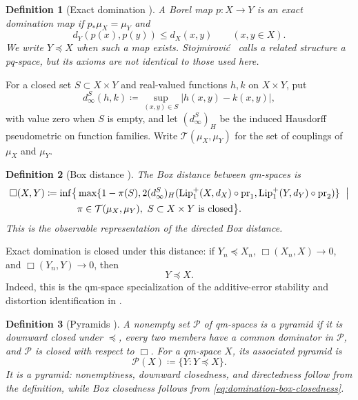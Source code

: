 \documentclass[10pt,a4paper]{amsart}
\numberwithin{equation}{section}
\newtheorem*{definition*}{Definition}
\newcommand{\Pyr}{\mathcal P}
\newcommand{\Lipplus}{\operatorname{Lip}^{+}_{1}}
\begin{document}
\begin{definition*}[Exact domination {\cite[Definition in \S2.1]{gds3-ja}}]
A Borel map $p\colon X\to Y$ is an \emph{exact domination map} if $p_*\mu_X=\mu_Y$ and
\[ d_Y(p(x),p(y))\le d_X(x,y)\qquad(x,y\in X). \]
We write $Y\preceq X$ when such a map exists.  Stojmirovi\'c~\cite{stojmirovic2004quasi} calls a related structure a pq-space, but its axioms are not identical to those used here.
\end{definition*}

For a closed set $S\subset X\times Y$ and real-valued functions $h,k$ on $X\times Y$, put
\[ d_\infty^S(h,k)\coloneqq\sup_{(x,y)\in S}|h(x,y)-k(x,y)|, \]
with value zero when $S$ is empty, and let $(d_\infty^S)_H$ be the induced Hausdorff pseudometric on function families.  Write $\mathcal T(\mu_X,\mu_Y)$ for the set of couplings of $\mu_X$ and $\mu_Y$.

\begin{definition*}[Box distance {\cite[Definitions~2.7 and~2.11]{gds3-ja}}]
The \emph{Box distance} between qm-spaces is
\begin{equation}\label{eq:qm-box-distance}
\begin{aligned}
\Box(X,Y)\coloneqq\inf\bigl\{&\max\{1-\pi(S),2(d_\infty^S)_H(\Lipplus(X,d_X)\circ\operatorname{pr}_1,\Lipplus(Y,d_Y)\circ\operatorname{pr}_2)\}\ \bigm|\\
&\pi\in\mathcal T(\mu_X,\mu_Y),\ S\subset X\times Y\text{ is closed}\bigr\}.
\end{aligned}
\end{equation}
This is the observable representation of the directed Box distance.
\end{definition*}

Exact domination is closed under this distance: if $Y_n\preceq X_n$, $\Box(X_n,X)\to0$, and $\Box(Y_n,Y)\to0$, then
\begin{equation}\label{eq:domination-box-closedness} Y\preceq X. \end{equation}
Indeed, this is the qm-space specialization of the additive-error stability and distortion identification in \cite[Definition~3.1 and Propositions~3.4, 3.5, and~3.8]{one-sided-pyramids}.

\begin{definition*}[Pyramids {\cite[Definition~A.2]{gds3-ja}}]
A nonempty set $\mathcal P$ of qm-spaces is a \emph{pyramid} if it is downward closed under $\preceq$, every two members have a common dominator in $\mathcal P$, and $\mathcal P$ is closed with respect to $\Box$.  For a qm-space $X$, its associated pyramid \cite[Proposition~A.9]{gds3-ja} is
\[ \Pyr(X)\coloneqq\{Y\colon Y\preceq X\}. \]
It is a pyramid: nonemptiness, downward closedness, and directedness follow from the definition, while Box closedness follows from \eqref{eq:domination-box-closedness}.
\end{definition*}
\end{document}
